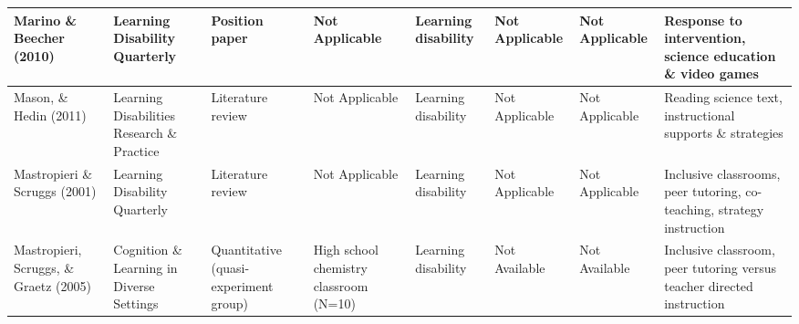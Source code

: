 \documentclass[11.5pt]{sig-alternate}
\begin{document}
\begin{@twocolumnfalse}
\begin{table}
\begin{tabular}{m{0.72in}m{0.72in}m{0.72in}m{0.72in}m{0.72in}m{0.72in}m{0.72in}m{0.72in}}
Marino \&  Beecher (2010)                            & Learning Disability Quarterly                                   & Position paper                        &  \centering Not Applicable                                                                               & Learning disability                               &  \centering Not Applicable                                                                                         &  \centering Not Applicable                                                   & Response to intervention, science education \& video games                                               \\ \hline
Mason, \& Hedin (2011)                                  & Learning Disabilities Research \& Practice                      & Literature review                     &  \centering Not Applicable                                                                               & Learning disability                               &  \centering Not Applicable                                                                                         &  \centering Not Applicable                                                   & Reading science text, instructional supports \& strategies                                               \\ \hline
Mastropieri \&  Scruggs (2001)                       & Learning Disability Quarterly                                   & Literature review                     &  \centering Not Applicable                                                                               & Learning disability                               &  \centering Not Applicable                                                                                         &  \centering Not Applicable                                                   & Inclusive classrooms, peer tutoring, co-teaching, strategy instruction                                   \\ \hline
Mastropieri, Scruggs, \& Graetz (2005)                  & Cognition \& Learning in Diverse Settings                       & Quantitative (quasi-experiment group) & High school chemistry classroom (N=10)                                                       & Learning disability                               &  \centering Not Available                                                                                          &  \centering Not Available                                                    & Inclusive classroom, peer tutoring versus teacher directed instruction                                   \\ \hline

\end{tabular}
\end{table}
\end{@twocolumnfalse}
\end{document}
